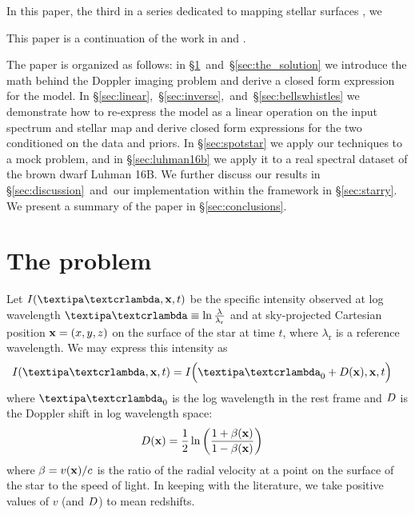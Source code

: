 \documentclass[modern]{aastex631}
\begin{document}

In this paper, the third in a series dedicated to mapping stellar surfaces \citep{Luger2021a,Luger2021b}, we 


This paper is a continuation of the work in \citep{Bedell2019} and \citep{Luger2019}.


The paper is organized as follows: in \S\ref{sec:the_problem}~and~\S\ref{sec:the_solution} we introduce the math behind the Doppler imaging problem and derive a closed form expression for the model. 
In \S\ref{sec:linear},~\S\ref{sec:inverse},~and~\S\ref{sec:bellswhistles} we demonstrate how to re-express the model as a linear operation on the input spectrum and stellar map and derive closed form expressions for the two conditioned on the data and priors.
In \S\ref{sec:spotstar} we apply our techniques to a mock problem, and in \S\ref{sec:luhman16b} we apply it to a real spectral dataset of the brown dwarf Luhman 16B.
We further discuss our results in \S\ref{sec:discussion}~and~our implementation within the \starry framework in \S\ref{sec:starry}.
We present a summary of the paper in \S\ref{sec:conclusions}. 

\section{The problem}
\label{sec:the_problem}
%
Let $I(\lnlam, \x, t)$ be the specific intensity observed at log wavelength $\lnlam \equiv \ln\frac{\lambda}{\lambda_\mathrm{r}}$ and at sky-projected Cartesian position ${\mathbf{x}} = (x, y, z)$ on the surface of the star at time $t$, where $\lambda_\mathrm{r}$ is a reference wavelength.
We may express this intensity as
%
\begin{align}
    \label{eq:the_problem:Ixi}
    I(\lnlam, \x, t) & =
    I\Big(\lnlam_0 + \D(\x), \x, t\Big)
\end{align}
%
where $\lnlam_0$ is the log wavelength in the rest frame and $D$ is the Doppler shift in log wavelength space:
%
\begin{align}
    \label{eq:the_problem:D}
    D({\mathbf{x}})
     & =
    \frac{1}{2}\ln\left(
    \frac{1 + \beta({\mathbf{x}})}{1 - \beta({\mathbf{x}})}
    \right)
\end{align}
%
where $\beta = v({\mathbf{x}}) / c$ is the ratio of the radial velocity at a point on the surface of the star to the speed of light.
In keeping with the literature, we take positive values of $v$ (and $D$) to mean redshifts.
\end{document}
